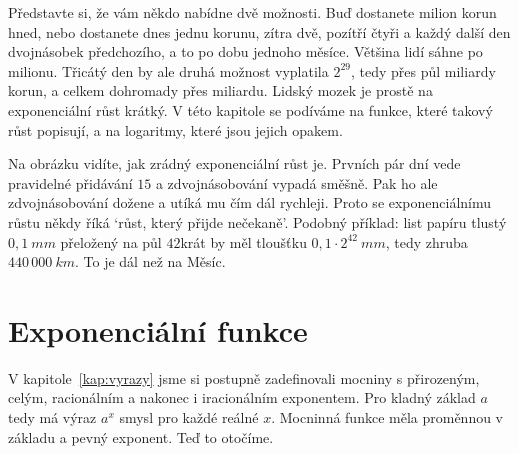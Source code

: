 \label{kap:exponencialni}

Představte si, že vám někdo nabídne dvě možnosti. Buď dostanete milion korun hned, nebo dostanete dnes jednu korunu, zítra dvě, pozítří čtyři a každý další den dvojnásobek předchozího, a to po dobu jednoho měsíce. Většina lidí sáhne po milionu. Třicátý den by ale druhá možnost vyplatila $2^{29}$, tedy přes půl miliardy korun, a celkem dohromady přes miliardu. Lidský mozek je prostě na exponenciální růst krátký. V této kapitole se podíváme na funkce, které takový růst popisují, a na logaritmy, které jsou jejich opakem.

\begin{center}
\end{center}

Na obrázku vidíte, jak zrádný exponenciální růst je. Prvních pár dní vede pravidelné přidávání $15$ a zdvojnásobování vypadá směšně. Pak ho ale zdvojnásobování dožene a utíká mu čím dál rychleji. Proto se exponenciálnímu růstu někdy říká `růst, který přijde nečekaně'. Podobný příklad: list papíru tlustý $0{,}1\ \si{mm}$ přeložený na půl $42$krát by měl tloušťku $0{,}1\cdot 2^{42}\ \si{mm}$, tedy zhruba $440\,000\ \si{km}$. To je dál než na Měsíc.

\section{Exponenciální funkce}\label{sec:exponencialni-funkce}

V kapitole~\ref{kap:vyrazy} jsme si postupně zadefinovali mocniny s přirozeným, celým, racionálním a nakonec i iracionálním exponentem. Pro kladný základ $a$ tedy má výraz $a^x$ smysl pro každé reálné $x$. Mocninná funkce měla proměnnou v základu a pevný exponent. Teď to otočíme.

